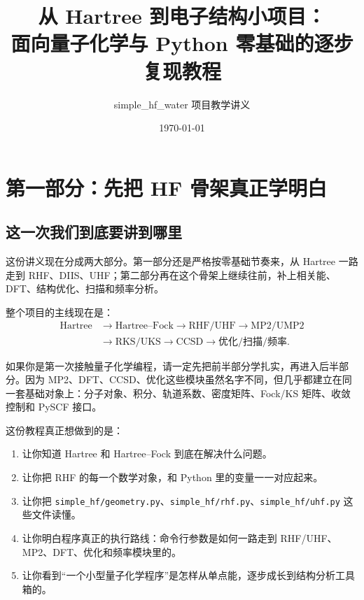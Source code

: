 \documentclass[UTF8,11pt,fontset=fandol]{ctexbook}
\title{从 Hartree 到电子结构小项目：\\
\large 面向量子化学与 Python 零基础的逐步复现教程}
\author{simple\_hf\_water 项目教学讲义}
\date{\today}
\begin{document}
\maketitle
\tableofcontents
\part{第一部分：先把 HF 骨架真正学明白}

\chapter{这一次我们到底要讲到哪里}

这份讲义现在分成两大部分。第一部分还是严格按零基础节奏来，从 Hartree 一路走到 RHF、DIIS、UHF；第二部分再在这个骨架上继续往前，补上相关能、DFT、结构优化、扫描和频率分析。

整个项目的主线现在是：
\begin{equation}
\begin{aligned}
\text{Hartree}
&\longrightarrow
\text{Hartree--Fock}
\longrightarrow
\text{RHF/UHF}
\longrightarrow
\text{MP2/UMP2} \\
&\longrightarrow
\text{RKS/UKS}
\longrightarrow
\text{CCSD}
\longrightarrow
\text{优化/扫描/频率}.
\end{aligned}
\end{equation}

\begin{goalbox}[阅读路线]
如果你是第一次接触量子化学编程，请一定先把前半部分学扎实，再进入后半部分。因为 MP2、DFT、CCSD、优化这些模块虽然名字不同，但几乎都建立在同一套基础对象上：分子对象、积分、轨道系数、密度矩阵、Fock/KS 矩阵、收敛控制和 PySCF 接口。
\end{goalbox}

这份教程真正想做到的是：
\begin{enumerate}[label=\arabic*.]
  \item 让你知道 Hartree 和 Hartree--Fock 到底在解决什么问题。
  \item 让你把 RHF 的每一个数学对象，和 Python 里的变量一一对应起来。
  \item 让你把 \texttt{simple\_hf/geometry.py}、\texttt{simple\_hf/rhf.py}、\texttt{simple\_hf/uhf.py} 这些文件读懂。
  \item 让你明白程序真正的执行路线：命令行参数是如何一路走到 RHF/UHF、MP2、DFT、优化和频率模块里的。
  \item 让你看到“一个小型量子化学程序”是怎样从单点能，逐步成长到结构分析工具箱的。
\end{enumerate}
\end{document}
